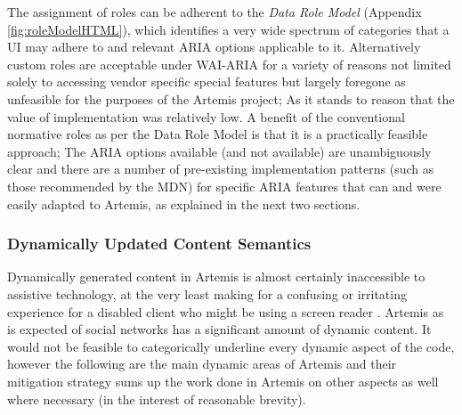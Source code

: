 The assignment of roles can be adherent to the \textit{Data Role Model} (Appendix \ref{fig:roleModelHTML}), which identifies a very wide spectrum of categories that a UI may adhere to and relevant ARIA options applicable to it. Alternatively custom roles are acceptable under WAI-ARIA for a variety of reasons not limited solely to accessing vendor specific special features \cite{W3C2014,CraigJamesH,MDN} but largely foregone as unfeasible for the purposes of the Artemis project; As it stands to reason that the value of implementation was relatively low. A benefit of  the conventional normative roles as per the Data Role Model is that it is a  practically feasible approach; The ARIA options available (and not available) are unambiguously clear and there are a number of pre-existing implementation patterns (such as those recommended by the MDN) for specific ARIA features that can and were easily adapted to Artemis, as explained in the next two sections.

\subsubsection{Dynamically Updated Content Semantics}


Dynamically generated content in Artemis is almost certainly inaccessible to assistive technology, at the very least making for a confusing or irritating experience for a disabled client who might be using a screen reader \cite{MozillaDeveloperNetwork,MozillaDeveloperNetworkb,MozillaDeveloperNetworkc}. Artemis as is expected of social networks has a significant amount of dynamic content. It would not be feasible to categorically underline every dynamic aspect of the  code, however the following are the main dynamic areas of Artemis and their mitigation strategy sums up the work done in Artemis on other aspects as well where necessary (in the interest of reasonable brevity).


